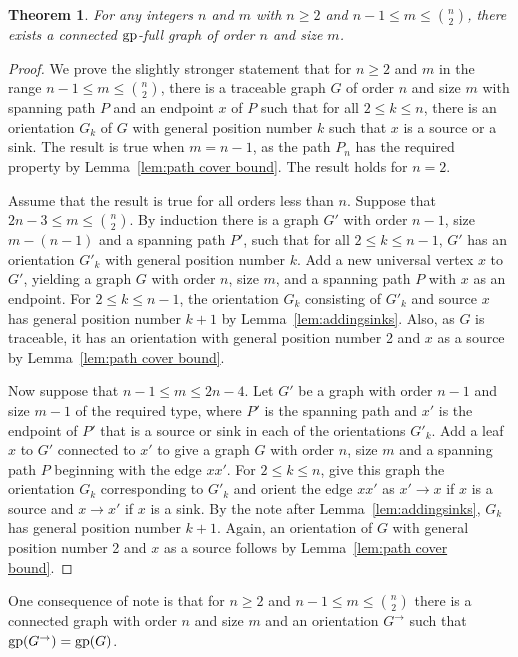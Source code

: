 \documentclass[a4paper,12pt]{article}
\newtheorem{theorem}{Theorem}[section]
\theoremstyle{definition}
\newcommand{\gp}{{\rm gp}}
\begin{document}
	\begin{theorem}
		For any integers $n$ and $m$ with $n \geq 2$ and $n-1 \leq m \leq \binom{n}{2}$, there exists a connected $\gp$-full graph of order $n$ and size $m$. 
	\end{theorem}
	\begin{proof}
		We prove the slightly stronger statement that for $n \geq 2$ and $m$ in the range $n-1 \leq m \leq \binom{n}{2}$, there is a traceable graph $G$ of order $n$ and size $m$ with spanning path $P$ and an endpoint $x$ of $P$ such that for all $2 \leq k \leq n$, there is an orientation $G_k$ of $G$ with general position number $k$ such that $x$ is a source or a sink. The result is true when $m = n-1$, as the path $P_n$ has the required property by Lemma~\ref{lem:path cover bound}. The result holds for $n = 2$.
		
		Assume that the result is true for all orders less than $n$. Suppose that $2n-3 \leq m \leq \binom{n}{2}$. By induction there is a graph $G'$ with order $n-1$, size $m-(n-1)$ and a spanning path $P'$, such that for all $2 \leq k \leq n-1$, $G'$ has an orientation $G'_k$ with general position number $k$. Add a new universal vertex $x$ to $G'$, yielding a graph $G$ with order $n$, size $m$, and a spanning path $P$ with $x$ as an endpoint. For $2 \leq k \leq n-1$, the orientation $G_k$ consisting of $G'_k$ and source $x$ has general position number $k+1$ by Lemma~\ref{lem:addingsinks}. Also, as $G$ is traceable, it has an orientation with general position number 2 and $x$ as a source by Lemma~\ref{lem:path cover bound}.  
		
		Now suppose that $n-1 \leq m \leq 2n-4$. Let $G'$ be a graph with order $n-1$ and size $m-1$ of the required type, where $P'$ is the spanning path and $x'$ is the endpoint of $P'$ that is a source or sink in each of the orientations $G'_k$. Add a leaf $x$ to $G'$ connected to $x'$ to give a graph $G$ with order $n$, size $m$ and a spanning path $P$ beginning with the edge $xx'$. For $2 \leq k \leq n$, give this graph the orientation $G_k$ corresponding to $G'_k$ and orient the edge $xx'$ as $x' \rightarrow x$ if $x$ is a source and $x \rightarrow x'$ if $x$ is a sink. By the note after Lemma~\ref{lem:addingsinks}, $G_k$ has general position number $k+1$. Again, an orientation of $G$ with general position number 2 and $x$ as a source follows by Lemma~\ref{lem:path cover bound}. 
	\end{proof}
	
	One consequence of note is that for $n \geq 2$ and $n-1 \leq m \leq \binom{n}{2}$ there is a connected graph with order $n$ and size $m$ and an orientation $G^{\rightarrow }$ such that $\gp (G^{\rightarrow }) = \gp (G)$. 
	
\end{document}
